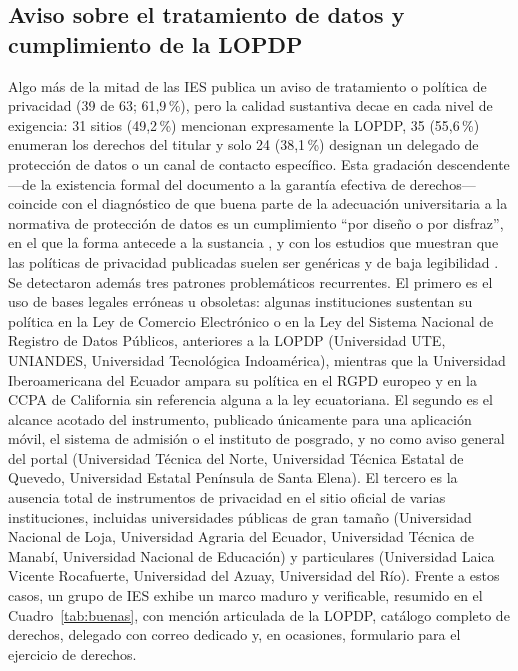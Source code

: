 \documentclass[11pt,a4paper]{article}
\begin{document}
\subsection{Aviso sobre el tratamiento de datos y cumplimiento de la LOPDP}
Algo m\'as de la mitad de las IES publica un aviso de tratamiento o pol\'itica de privacidad (39 de 63; 61,9\,\%), pero la calidad sustantiva decae en cada nivel de exigencia: 31 sitios (49,2\,\%) mencionan expresamente la LOPDP, 35 (55,6\,\%) enumeran los derechos del titular y solo 24 (38,1\,\%) designan un delegado de protecci\'on de datos o un canal de contacto espec\'ifico.
Esta gradaci\'on descendente ---de la existencia formal del documento a la garant\'ia efectiva de derechos--- coincide con el diagn\'ostico de que buena parte de la adecuaci\'on universitaria a la normativa de protecci\'on de datos es un cumplimiento ``por dise\~no o por disfraz'', en el que la forma antecede a la sustancia \citep{munot2025compliance}, y con los estudios que muestran que las pol\'iticas de privacidad publicadas suelen ser gen\'ericas y de baja legibilidad \citep{fabian2017largescale,singh2011usercentric,belcheva2023understanding}.
Se detectaron adem\'as tres patrones problem\'aticos recurrentes.
El primero es el uso de bases legales err\'oneas u obsoletas: algunas instituciones sustentan su pol\'itica en la Ley de Comercio Electr\'onico o en la Ley del Sistema Nacional de Registro de Datos P\'ublicos, anteriores a la LOPDP (Universidad UTE, UNIANDES, Universidad Tecnol\'ogica Indoam\'erica), mientras que la Universidad Iberoamericana del Ecuador ampara su pol\'itica en el RGPD europeo y en la CCPA de California sin referencia alguna a la ley ecuatoriana.
El segundo es el alcance acotado del instrumento, publicado \'unicamente para una aplicaci\'on m\'ovil, el sistema de admisi\'on o el instituto de posgrado, y no como aviso general del portal (Universidad T\'ecnica del Norte, Universidad T\'ecnica Estatal de Quevedo, Universidad Estatal Pen\'insula de Santa Elena).
El tercero es la ausencia total de instrumentos de privacidad en el sitio oficial de varias instituciones, incluidas universidades p\'ublicas de gran tama\~no (Universidad Nacional de Loja, Universidad Agraria del Ecuador, Universidad T\'ecnica de Manab\'i, Universidad Nacional de Educaci\'on) y particulares (Universidad Laica Vicente Rocafuerte, Universidad del Azuay, Universidad del R\'io).
Frente a estos casos, un grupo de IES exhibe un marco maduro y verificable, resumido en el Cuadro~\ref{tab:buenas}, con menci\'on articulada de la LOPDP, cat\'alogo completo de derechos, delegado con correo dedicado y, en ocasiones, formulario para el ejercicio de derechos.
\end{document}
